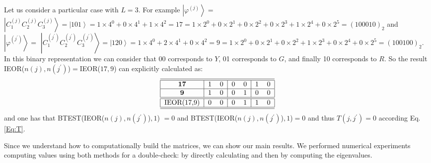 \documentclass[3p, 10pt, onecolumn]{elsarticle}
\begin{document}
Let us consider a particular case with $L=3$. For example $%
\left\vert \varphi ^{(j)}\right\rangle =$ $\left\vert
C_{1}^{(j)}C_{2}^{(j)}C_{3}^{(j)}\right\rangle =\left\vert 101\right\rangle
=1\times 4^{0}+0\times 4^{1}+1\times 4^{2}=17=1\times 2^{0}+0\times
2^{1}+0\times 2^{2}+0\times 2^{3}+1\times 2^{4}+0\times 2^{5}=(100010)_{2}$
and $\left\vert \varphi ^{(j^{\prime })}\right\rangle =$ $\left\vert
C_{1}^{(j^{\prime })}C_{2}^{(j^{\prime })}C_{3}^{(j^{\prime })}\right\rangle
=\left\vert 120\right\rangle =1\times 4^{0}+2\times 4^{1}+0\times
4^{2}=9=1\times 2^{0}+0\times 2^{1}+0\times 2^{2}+1\times 2^{3}+0\times
2^{4}+0\times 2^{5}=(100100)_{2}$. In this binary representation we can
consider that 00 corresponds to $Y$, 01 corresponds to $G$, and finally 10
corresponds to $R$. So the result IEOR($n(j),n(j^{\prime })$)$=$IEOR($17,9$)
can explicitly calculated as:%
\begin{equation}
\begin{tabular}{|c|ll|ll|ll|}
\hline\hline
\textbf{17} & 1 & 0 & 0 & 0 & 1 & 0 \\ \hline
\textbf{9} & 1 & 0 & 0 & 1 & 0 & 0 \\ \hline\hline
IEOR(17,9) & 0 & 0 & 0 & 1 & 1 & 0 \\ \hline\hline
\end{tabular}%
\end{equation}%
and one has that BTEST(IEOR($n(j),n(j^{\prime })$)$,1$) $=0$ and BTEST(IEOR($%
n(j),n(j^{\prime })$)$,1$)$=0$ and thus $T(j,j^{\prime })=0$ according Eq. %
\ref{Eq:T}.

Since we understand how to computationally build the matrices, we can show
our main results. We performed numerical experiments computing values using
both methods for a double-check: by directly calculating and then by
computing the eigenvalues.
\end{document}
